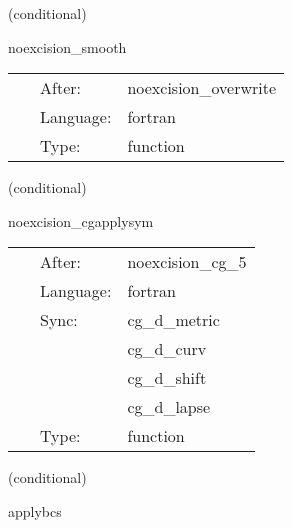 \vspace{5mm}

   (conditional) 

\hspace{5mm} noexcision\_smooth 

\hspace{5mm}{\it smooth regions } 


\hspace{5mm}

 \begin{tabular*}{160mm}{cll} 
~ & After:  & noexcision\_overwrite \\ 
~ & Language:  & fortran \\ 
~ & Type:  & function \\ 
\end{tabular*} 


\vspace{5mm}

   (conditional) 

\hspace{5mm} noexcision\_cgapplysym 

\hspace{5mm}{\it select variables for boundary conditions 4 } 


\hspace{5mm}

 \begin{tabular*}{160mm}{cll} 
~ & After:  & noexcision\_cg\_5 \\ 
~ & Language:  & fortran \\ 
~ & Sync:  & cg\_d\_metric \\ 
~& ~ &cg\_d\_curv\\ 
~& ~ &cg\_d\_shift\\ 
~& ~ &cg\_d\_lapse\\ 
~ & Type:  & function \\ 
\end{tabular*} 


\vspace{5mm}

   (conditional) 

\hspace{5mm} applybcs 

\hspace{5mm}{\it apply boundary conditions (symmetries) 4 } 


\hspace{5mm}

